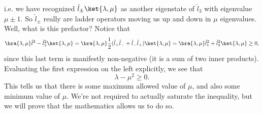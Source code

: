 i.e. we have recognized $\hat l_\pm \ket{\lambda,\mu}$ as another eigenstate of $\hat l_3$ with eigenvalue $\mu \pm 1$. So $\hat l_\pm$ really are ladder operators moving us up and down in $\mu$ eigenvalues. Well, what is this prefactor? Notice that
\begin{equation}
    \bra{\lambda,\mu} \hat l^2 - \hat l_3^2 \ket{\lambda,\mu} = \bra{\lambda,\mu} \frac{1}{2} (\hat l_+ \hat l_- + \hat l_- \hat l_+) \ket{\lambda,\mu} = \bra{\lambda,\mu} \hat l_1^2 + \hat l_2^2 \ket{\lambda,\mu} \geq 0,
\end{equation}
since this last term is manifestly non-negative (it is a sum of two inner products). Evaluating the first expression on the left explicitly, we see that
\begin{equation}
    \lambda-\mu^2 \geq 0.
\end{equation}
This tells us that there is some maximum allowed value of $\mu$, and also some minimum value of $\mu$. We're not required to actually saturate the inequality, but we will prove that the mathematics allows us to do so.

